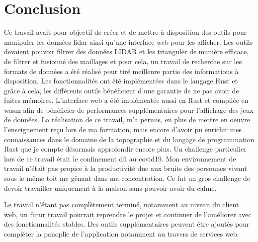 \chapter*{Conclusion}

Ce travail avait pour objectif de créer et de mettre à disposition des outils pour manipuler les données \gls{lidar} ainsi qu'une interface web pour les afficher.
Les outils devaient pouvoir filtrer des données LIDAR et les trianguler de manière efficace, de filtrer et fusionné des maillages et pour cela, un travail de recherche sur les formats de données a été réalisé pour tiré meilleure partie des informations à disposition.
Les fonctionnalités ont été implémentées dans le langage Rust et grâce à cela, les différents outils bénéficient d'une garantie de ne pas avoir de fuites mémoires.
L'interface web a été implémentée aussi en Rust et compilée en \gls{wasm} afin de bénéficier de performances supplémentaires pour l'affichage des jeux de données. 
La réalisation de ce travail, m'a permis, en plus de mettre en oeuvre l'enseignement reçu lors de ma formation, mais encore d'avoir pu enrichir mes connaissances dans le domaine de la topographie et du langage de programmation Rust que je compte désormais approfondir encore plus. Un challenge particulier lors de ce travail était le confinement dû au covid19. Mon environnement de travail n'était pas propice à la productivité due aux bruits des personnes vivant sous le même toit me gênant dans ma concentration. Ce fut un gros challenge de devoir travailler uniquement à la maison sans pouvoir avoir du calme.

Le travail n'étant pas complètement terminé, notamment au niveau du client web, un futur travail pourrait reprendre le projet et continuer de l'améliorer avec des fonctionnalités stables. Des outils supplémentaires peuvent être ajoutés pour compléter la panoplie de l'application notamment au travers de services web.